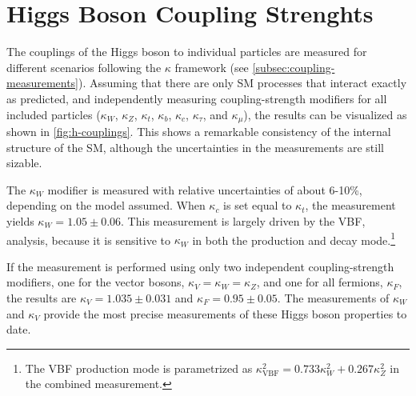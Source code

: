 \FloatBarrier

\section{Higgs Boson Coupling Strenghts}
The couplings of the Higgs boson to individual particles are measured for different scenarios following the $\kappa$ framework (see \cref{subsec:coupling-measurements}).
Assuming that there are only SM processes that interact exactly as predicted, and independently measuring coupling-strength modifiers for all included particles ($\kappa_W$, $\kappa_Z$, $\kappa_t$, $\kappa_b$, $\kappa_c$, $\kappa_\tau$, and $\kappa_\mu$), the results can be visualized as shown in \cref{fig:h-couplings}. 
This shows a remarkable consistency of the internal structure of the SM, although the uncertainties in the measurements are still sizable. 

The $\kappa_W$ modifier is measured with relative uncertainties of about 6-10\%, depending on the model assumed. 
When $\kappa_c$ is set equal to $\kappa_t$, the measurement yields $\kappa_W = 1.05 \pm 0.06$.
This measurement is largely driven by the VBF, \HWW analysis, because it is sensitive to $\kappa_W$ in both the production and decay mode.\footnote{The VBF production mode is parametrized as $\kappa_\mathrm{VBF}^2 = 0.733 \kappa^2_W + 0.267 \kappa^2_Z$ in the combined measurement.}

If the measurement is performed using only two independent coupling-strength modifiers, one for the vector bosons, $\kappa_V = \kappa_W = \kappa_Z$, and one for all fermions, $\kappa_F$, the results are $\kappa_V = 1.035 \pm 0.031$ and $\kappa_F = 0.95 \pm 0.05$. 
The measurements of $\kappa_W$ and $\kappa_V$ provide the most precise measurements of these Higgs boson properties to date.

